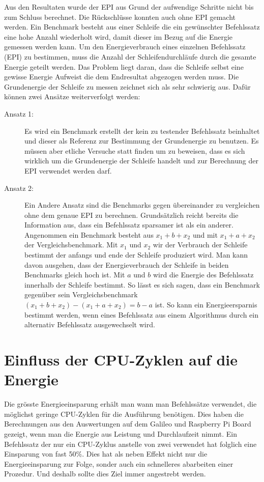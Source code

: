 Aus den Resultaten wurde der EPI aus Grund der aufwendige Schritte nicht bis zum Schluss berechnet. Die Rückschlüsse konnten auch ohne EPI gemacht werden. Ein Benchmark besteht aus einer Schleife die ein gewünschter Befehlssatz eine hohe Anzahl wiederholt wird, damit dieser im Bezug auf die Energie gemessen werden kann. Um den Energieverbrauch eines einzelnen Befehlssatz (EPI) zu bestimmen, muss die Anzahl der Schleifendurchläufe durch die gesamte Energie geteilt werden. Das Problem liegt daran, dass die Schleife selbst eine gewisse Energie Aufweist die dem Endresultat abgezogen werden muss. Die Grundenergie der Schleife zu messen zeichnet sich als sehr schwierig aus. Dafür können zwei Ansätze weiterverfolgt werden:
\begin{description}
\item[Ansatz 1:]
Es wird ein Benchmark erstellt der kein zu testender Befehlssatz beinhaltet und dieser als Referenz zur Bestimmung der Grundenergie zu benutzen. Es müssen aber etliche Versuche statt finden um zu beweisen, dass es sich wirklich um die Grundenergie der Schleife handelt und zur Berechnung der EPI verwendet werden darf.
\par
\item[Ansatz 2:]
Ein Andere Ansatz sind die Benchmarks gegen übereinander zu vergleichen ohne dem genaue EPI zu berechnen. Grundsätzlich reicht bereits die Information aus, dass ein Befehlssatz sparsamer ist als ein anderer. Angenommen ein Benchmark besteht aus $x_1 + b + x_2$ und mit $x_1 + a + x_2$ der Vergleichsbenchmark. Mit $x_1$ und $x_2$ wir der Verbrauch der Schleife bestimmt der anfangs und ende der Schleife produziert wird. Man kann davon ausgehen, dass der Energieverbrauch der Schleife in beiden Benchmarks gleich hoch ist. Mit $a$ und $b$ wird die Energie des Befehlssatz innerhalb der Schleife bestimmt. So lässt es sich sagen, dass ein Benchmark gegenüber sein Vergleichsbenchmark $(x_1 + b + x_2) - (x_1 + a + x_2) = b - a$ ist. So kann ein Energieersparnis bestimmt werden, wenn eines Befehlssatz aus einem Algorithmus durch ein alternativ Befehlssatz ausgewechselt wird.
\end{description}


\section{Einfluss der CPU-Zyklen auf die Energie}
Die grösste Energieeinsparung erhält man wann man Befehlssätze verwendet, die möglichst geringe CPU-Zyklen für die Ausführung benötigen. Dies haben die Berechnungen aus den Auswertungen auf dem Galileo und Raspberry Pi Board gezeigt, wenn man die Energie aus Leistung und Durchlaufzeit nimmt. Ein Befehlssatz der nur ein CPU-Zyklus anstelle von zwei verwendet hat folglich eine Einsparung von fast 50\%. Dies hat als neben Effekt nicht nur die Energieeinsparung zur Folge, sonder auch ein schnelleres abarbeiten einer Prozedur. Und deshalb sollte dies Ziel immer angestrebt werden.

